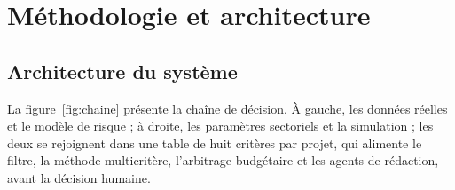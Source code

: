\chapter{Méthodologie et architecture}\label{chap:methodo}

\section{Architecture du système}

La figure~\ref{fig:chaine} présente la chaîne de décision. À gauche, les données réelles et le modèle de risque ;
à droite, les paramètres sectoriels et la simulation ; les deux se rejoignent dans une table de huit critères par
projet, qui alimente le filtre, la méthode multicritère, l'arbitrage budgétaire et les agents de rédaction, avant la
décision humaine.


